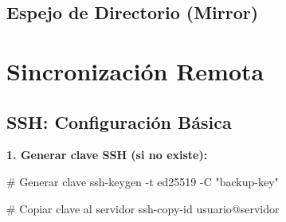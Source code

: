 \documentclass[
  doc,
  floatsintext,
  longtable,
  a4paper,
  nolmodern,
  notxfonts,
  notimes,
  12pt,
  colorlinks=true,linkcolor=blue,citecolor=blue,urlcolor=blue]{apa7}
\newenvironment{Shaded}{\begin{snugshade}}{\end{snugshade}}
\newcommand{\AttributeTok}[1]{\textcolor[rgb]{0.40,0.45,0.13}{#1}}
\newcommand{\CommentTok}[1]{\textcolor[rgb]{0.37,0.37,0.37}{#1}}
\newcommand{\DataTypeTok}[1]{\textcolor[rgb]{0.68,0.00,0.00}{#1}}
\newcommand{\ExtensionTok}[1]{\textcolor[rgb]{0.00,0.23,0.31}{#1}}
\newcommand{\FunctionTok}[1]{\textcolor[rgb]{0.28,0.35,0.67}{#1}}
\newcommand{\NormalTok}[1]{\textcolor[rgb]{0.00,0.23,0.31}{#1}}
\newcommand{\OperatorTok}[1]{\textcolor[rgb]{0.37,0.37,0.37}{#1}}
\newcommand{\StringTok}[1]{\textcolor[rgb]{0.13,0.47,0.30}{#1}}
\newcommand{\VariableTok}[1]{\textcolor[rgb]{0.07,0.07,0.07}{#1}}
\begin{document}
\subsection{Espejo de Directorio
(Mirror)}\label{espejo-de-directorio-mirror}

\begin{Shaded}
\end{Shaded}

\section{Sincronización Remota}\label{sincronizaciuxf3n-remota}

\subsection{SSH: Configuración
Básica}\label{ssh-configuraciuxf3n-buxe1sica}

\textbf{1. Generar clave SSH (si no existe):}

\begin{Shaded}
\begin{Highlighting}[]
\CommentTok{\# Generar clave}
\FunctionTok{ssh{-}keygen} \AttributeTok{{-}t}\NormalTok{ ed25519 }\AttributeTok{{-}C} \StringTok{"backup{-}key"}

\CommentTok{\# Copiar clave al servidor}
\ExtensionTok{ssh{-}copy{-}id}\NormalTok{ usuario@servidor}
\end{Highlighting}
\end{Shaded}
\end{document}
